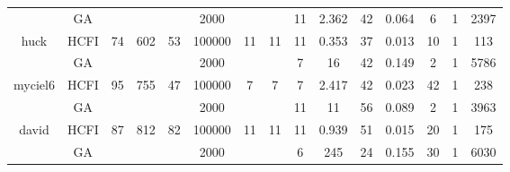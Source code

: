 \documentclass[10pt]{article}
\begin{document}
\begin{center}
\begin{table}[H]
\begin{tabular}{|c|c|c|c|c|c|c|c|c|c|c|c|c|c|c|}
	&GA&       &                   &                     & 2000        &     \cellcolor{yellow} & {\cellcolor{yellow}}& {{\cellcolor{green}11}}
&2.362   &42        & 0.064                  &    6                &1         & 2397       \\ \cline{2-2} \cline{6-6} \cline{9-15}
 \multirow{-2}{*}{huck} &HCFI   &\multirow{-2}{*}{74}   &\multirow{-2}{*}{602}     &\multirow{-2}{*}{53}     &100000      &\multirow{-2}{*}{\cellcolor{yellow}11}      & \multirow{-2}{*}{\cellcolor{yellow}11}    &{\cellcolor{green}11}     & 0.353         &37    &0.013         &10    &1     &113        \\ \hline \hline
	&GA&       &                   &                     &2000         &     \cellcolor{yellow} & {\cellcolor{yellow}}& {{\cellcolor{green}7}}
&16   & 42       & 0.149                 &2                   &1          & 5786       \\ \cline{2-2} \cline{6-6} \cline{9-15}
 \multirow{-2}{*}{myciel6} &HCFI   &\multirow{-2}{*}{95}   &\multirow{-2}{*}{755}     &\multirow{-2}{*}{47}     &100000     &\multirow{-2}{*}{\cellcolor{yellow}7}      & \multirow{-2}{*}{\cellcolor{yellow}7}    &{\cellcolor{green}7}     & 2.417         &42    &0.023         &42    &1     &238        \\ \hline \hline
	&GA&       &                   &                     &2000         &     \cellcolor{yellow} & {\cellcolor{yellow}}& {{\cellcolor{green}11}}
&11   &56        &0.089                   &2                    &1          & 3963       \\ \cline{2-2} \cline{6-6} \cline{9-15}
 \multirow{-2}{*}{david} &HCFI   &\multirow{-2}{*}{87}   &\multirow{-2}{*}{812}     &\multirow{-2}{*}{82}     &100000      &\multirow{-2}{*}{\cellcolor{yellow}11}      & \multirow{-2}{*}{\cellcolor{yellow}11}    &{\cellcolor{green}11}     &0.939         &51    &0.015         &20    &1     & 175       \\ \hline \hline
	&GA&       &                   &                     &2000         &     \cellcolor{yellow} & {\cellcolor{yellow}}& {{\cellcolor{green}6}}
&245   & 24       &0.155                   &30                    &1          &6030        \\ \cline{2-2} \cline{6-6} \cline{9-15}

\end{tabular}
\end{table}
\end{center}
\end{document}
